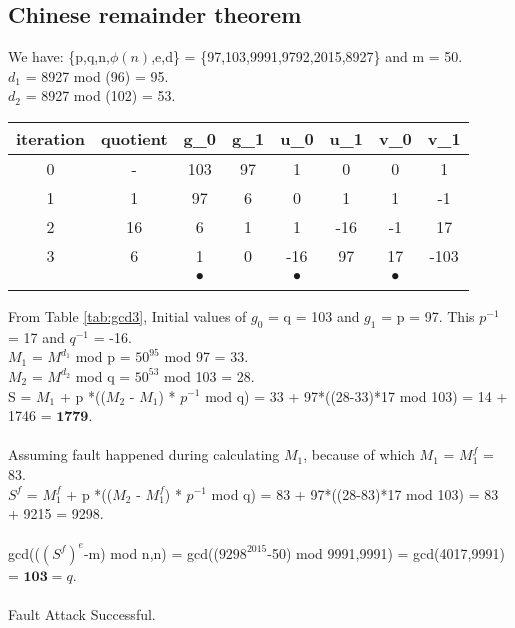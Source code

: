 \documentclass[11pt, pdftex]{article}
\begin{document}
\subsection{Chinese remainder theorem}
We have: \{p,q,n,$\phi(n)$,e,d\} = \{97,103,9991,9792,2015,8927\} and m = 50. \\
$d_{1}$ = 8927 mod (96) = 95.\\
$d_{2}$ = 8927 mod (102) = 53.\\
\begin{center}
\begin{tabular}{c||c|c|c|c|c|c|c} 
iteration & quotient & g_{0} & g_{1} & u_{0} & u_{1} & v_{0} & v_{1}\\
\hline
0 & - & 103 & 97 & 1 & 0 & 0 & 1 \\
\hline
1 & 1 & 97 & 6 & 0 & 1 & 1 & -1 \\
\hline
2 & 16 & 6 & 1 & 1 & -16 & -1 & 17\\
\hline
3 & 6 & 1 & 0 & -16 & 97 & 17 & -103\\
\hline
& & $\bullet$ & & $\bullet$ & & $\bullet$ & \\
\label{tab:gcd3}
\end{tabular}
\end{center}
From Table \ref{tab:gcd3}, Initial values of $g_{0}$ = q = 103 and $g_{1}$ = p = 97. This $p^{-1}$ = 17 and $q^{-1}$ = -16.\\
$M_{1}$ = $M^{d_{1}}$ mod p = $50^{95}$ mod 97 = 33.\\
$M_{2}$ = $M^{d_{2}}$ mod q = $50^{53}$ mod 103 = 28.\\
S = $M_{1}$ + p *(($M_{2}$ - $M_{1}$) * $p^{-1}$ mod q) = 33 + 97*((28-33)*17 mod 103) = 14 + 1746 = $\textbf{1779}$. \\
\\
Assuming fault happened during calculating $M_{1}$, because of which $M_{1}$ = $M_{1}^{f}$ = 83.\\
$S^{f}$ = $M_{1}^{f}$ + p *(($M_{2}$ - $M_{1}^{f}$) * $p^{-1}$ mod q) = 83 + 97*((28-83)*17 mod 103) = 83 + 9215 = 9298. \\
\\
gcd(($(S^{f})^{e}$-m) mod n,n) = gcd(($9298^{2015}$-50) mod 9991,9991) = gcd(4017,9991) = $\textbf{103} = q$. \\
\\
Fault Attack Successful.
\end{document}
